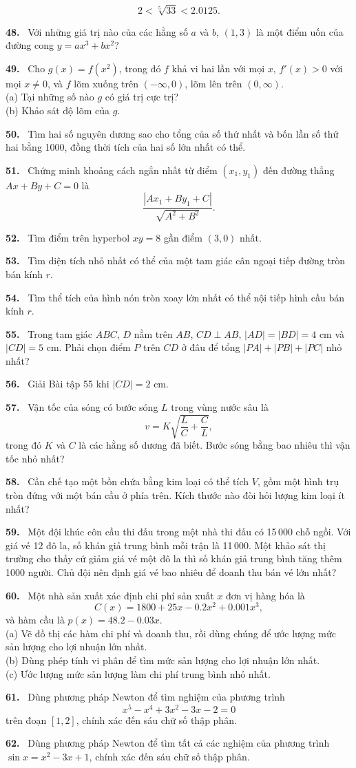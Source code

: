 \documentclass[12pt,a4paper]{article}
\newcommand{\bt}[1]{\par\smallskip\Needspace{5\baselineskip}\noindent\textbf{#1.}\ }
\begin{document}
\[2<\sqrt[5]{33}<2.0125.\]
\bt{48} Với những giá trị nào của các hằng số $a$ và $b$, $(1,3)$ là một điểm uốn của đường cong $y=ax^3+bx^2$?
\bt{49} Cho $g(x)=f(x^2)$, trong đó $f$ khả vi hai lần với mọi $x$, $f'(x)>0$ với mọi $x\ne0$, và $f$ lõm xuống trên $(-\infty,0)$, lõm lên trên $(0,\infty)$.\\(a) Tại những số nào $g$ có giá trị cực trị?\\(b) Khảo sát độ lõm của $g$.
\bt{50} Tìm hai số nguyên dương sao cho tổng của số thứ nhất và bốn lần số thứ hai bằng 1000, đồng thời tích của hai số lớn nhất có thể.
\bt{51} Chứng minh khoảng cách ngắn nhất từ điểm $(x_1,y_1)$ đến đường thẳng $Ax+By+C=0$ là
\[\frac{|Ax_1+By_1+C|}{\sqrt{A^2+B^2}}.\]
\bt{52} Tìm điểm trên hyperbol $xy=8$ gần điểm $(3,0)$ nhất.
\bt{53} Tìm diện tích nhỏ nhất có thể của một tam giác cân ngoại tiếp đường tròn bán kính $r$.
\bt{54} Tìm thể tích của hình nón tròn xoay lớn nhất có thể nội tiếp hình cầu bán kính $r$.
\bt{55} Trong tam giác $ABC$, $D$ nằm trên $AB$, $CD\perp AB$, $|AD|=|BD|=4$ cm và $|CD|=5$ cm. Phải chọn điểm $P$ trên $CD$ ở đâu để tổng $|PA|+|PB|+|PC|$ nhỏ nhất?
\bt{56} Giải Bài tập 55 khi $|CD|=2$ cm.
\bt{57} Vận tốc của sóng có bước sóng $L$ trong vùng nước sâu là
\[v=K\sqrt{\frac LC+\frac CL},\]
trong đó $K$ và $C$ là các hằng số dương đã biết. Bước sóng bằng bao nhiêu thì vận tốc nhỏ nhất?
\bt{58} Cần chế tạo một bồn chứa bằng kim loại có thể tích $V$, gồm một hình trụ tròn đứng với một bán cầu ở phía trên. Kích thước nào đòi hỏi lượng kim loại ít nhất?
\bt{59} Một đội khúc côn cầu thi đấu trong một nhà thi đấu có 15\,000 chỗ ngồi. Với giá vé 12 đô la, số khán giả trung bình mỗi trận là 11\,000. Một khảo sát thị trường cho thấy cứ giảm giá vé một đô la thì số khán giả trung bình tăng thêm 1000 người. Chủ đội nên định giá vé bao nhiêu để doanh thu bán vé lớn nhất?
\bt{60} Một nhà sản xuất xác định chi phí sản xuất $x$ đơn vị hàng hóa là
\[C(x)=1800+25x-0.2x^2+0.001x^3,\]
và hàm cầu là $p(x)=48.2-0.03x$.\\(a) Vẽ đồ thị các hàm chi phí và doanh thu, rồi dùng chúng để ước lượng mức sản lượng cho lợi nhuận lớn nhất.\\(b) Dùng phép tính vi phân để tìm mức sản lượng cho lợi nhuận lớn nhất.\\(c) Ước lượng mức sản lượng làm chi phí trung bình nhỏ nhất.
\bt{61} Dùng phương pháp Newton để tìm nghiệm của phương trình
\[x^5-x^4+3x^2-3x-2=0\]
trên đoạn $[1,2]$, chính xác đến sáu chữ số thập phân.
\bt{62} Dùng phương pháp Newton để tìm tất cả các nghiệm của phương trình $\sin x=x^2-3x+1$, chính xác đến sáu chữ số thập phân.
\end{document}
